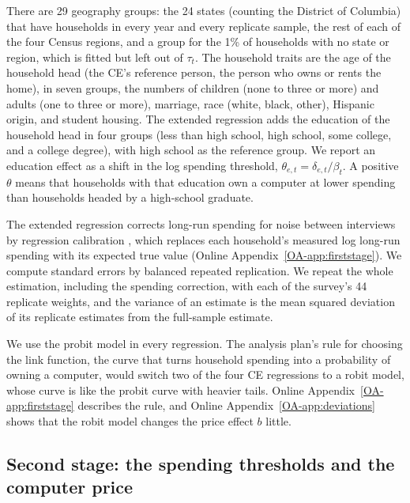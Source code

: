 \documentclass[11pt]{article}
\begin{document}
There are 29 geography groups: the 24 states (counting the District of Columbia) that have households in every year and every replicate sample, the rest of each of the four Census regions, and a group for the 1\% of households with no state or region, which is fitted but left out of $\tau_t$. The household traits are the age of the household head (the CE's reference person, the person who owns or rents the home), in seven groups, the numbers of children (none to three or more) and adults (one to three or more), marriage, race (white, black, other), Hispanic origin, and student housing. The extended regression adds the education of the household head in four groups (less than high school, high school, some college, and a college degree), with high school as the reference group. We report an education effect as a shift in the log spending threshold, $\theta_{e,t} = \delta_{e,t}/\beta_t$. A positive $\theta$ means that households with that education own a computer at lower spending than households headed by a high-school graduate.

The extended regression corrects long-run spending for noise between interviews by regression calibration \citep[ch.~4]{carroll2006}, which replaces each household's measured log long-run spending with its expected true value (Online Appendix~\ref{OA-app:firststage}). We compute standard errors by balanced repeated replication. We repeat the whole estimation, including the spending correction, with each of the survey's 44 replicate weights, and the variance of an estimate is the mean squared deviation of its replicate estimates from the full-sample estimate.

We use the probit model in every regression. The analysis plan's rule for choosing the link function, the curve that turns household spending into a probability of owning a computer, would switch two of the four CE regressions to a robit model, whose curve is like the probit curve with heavier tails. Online Appendix~\ref{OA-app:firststage} describes the rule, and Online Appendix~\ref{OA-app:deviations} shows that the robit model changes the price effect $b$ little.

\subsection{Second stage: the spending thresholds and the computer price}
\end{document}
